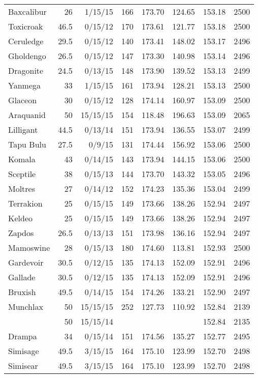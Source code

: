 \begin{longtable}{lrrrrrrr}
Baxcalibur & 26 & 1/15/15 & 166 & 173.70 & 124.65 & 153.18 & 2500\\
Toxicroak & 46.5 & 0/15/12 & 170 & 173.61 & 121.77 & 153.18 & 2500\\
Ceruledge & 29.5 & 0/15/12 & 140 & 173.41 & 148.02 & 153.17 & 2496\\
Gholdengo & 26.5 & 0/15/12 & 147 & 173.30 & 140.98 & 153.14 & 2496\\
Dragonite & 24.5 & 0/13/15 & 148 & 173.90 & 139.52 & 153.13 & 2499\\
Yanmega & 33 & 1/15/15 & 161 & 173.94 & 128.21 & 153.13 & 2500\\
Glaceon & 30 & 0/15/12 & 128 & 174.14 & 160.97 & 153.09 & 2500\\
Araquanid & 50 & 15/15/15 & 154 & 118.48 & 196.63 & 153.09 & 2065\\
Lilligant & 44.5 & 0/13/14 & 151 & 173.94 & 136.55 & 153.07 & 2499\\
Tapu Bulu & 27.5 & 0/9/15 & 131 & 174.44 & 156.92 & 153.06 & 2500\\
Komala & 43 & 0/14/15 & 143 & 173.94 & 144.15 & 153.06 & 2500\\
Sceptile & 38 & 0/15/13 & 144 & 173.70 & 143.32 & 153.05 & 2496\\
Moltres & 27 & 0/14/12 & 152 & 174.23 & 135.36 & 153.04 & 2499\\
Terrakion & 25 & 0/15/15 & 149 & 173.66 & 138.26 & 152.94 & 2497\\
Keldeo & 25 & 0/15/15 & 149 & 173.66 & 138.26 & 152.94 & 2497\\
Zapdos & 26.5 & 0/13/13 & 151 & 173.98 & 136.16 & 152.94 & 2497\\
Mamoswine & 28 & 0/15/13 & 180 & 174.60 & 113.81 & 152.93 & 2500\\
Gardevoir & 30.5 & 0/12/15 & 135 & 174.13 & 152.09 & 152.91 & 2496\\
Gallade & 30.5 & 0/12/15 & 135 & 174.13 & 152.09 & 152.91 & 2496\\
Bruxish & 49.5 & 0/14/15 & 154 & 174.26 & 133.21 & 152.90 & 2497\\
Munchlax & 50 & 15/15/15 & 252 & 127.73 & 110.92 & 152.84 & 2139\\
 & 50 & 15/15/14 & & & & 152.84 & 2135\\
Drampa & 34 & 0/15/14 & 151 & 174.56 & 135.27 & 152.77 & 2495\\
Simisage & 49.5 & 3/15/15 & 164 & 175.10 & 123.99 & 152.70 & 2498\\
Simisear & 49.5 & 3/15/15 & 164 & 175.10 & 123.99 & 152.70 & 2498\\

\end{longtable}
